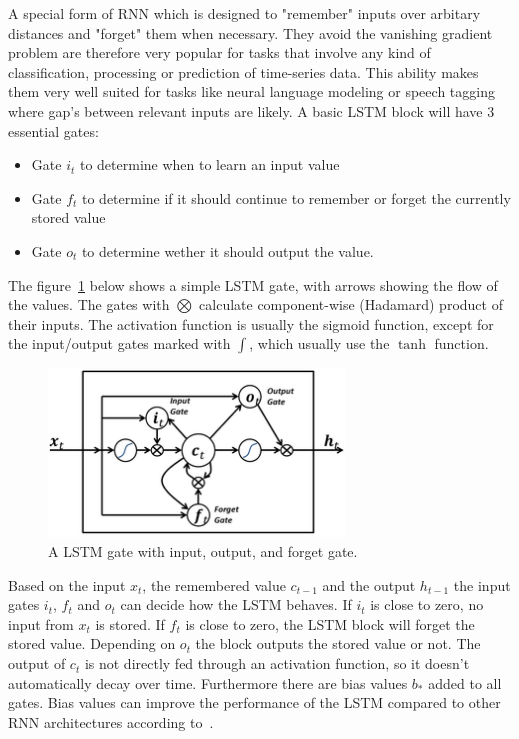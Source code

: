 A special form of RNN which is designed to "remember" inputs over arbitary distances and "forget" them when necessary.
They avoid the vanishing gradient problem are therefore very popular for tasks that involve any kind of classification,
processing or prediction of time-series data. This ability makes them very well suited for tasks like neural language modeling
or speech tagging where gap's between relevant inputs are likely.
A basic LSTM block will have 3 essential gates:

\begin{itemize}
\item Gate \(i_t\) to determine when to learn an input value
\item Gate \(f_t\) to determine if it should continue to remember or forget the currently stored value
\item Gate \(o_t\) to determine wether it should output the value.
\end{itemize}

The figure~\ref{fig:Long_Short_Term_Memory} below shows a simple LSTM gate, with arrows showing the flow of the values.
The gates with $\bigotimes$ calculate component-wise (Hadamard) product of their inputs. The activation function is usually 
the sigmoid function, except for the input/output gates marked with $\int$, which usually use the $\tanh$ function.

\begin{figure}[H]
\begin{center}
  \includegraphics[width=0.7\textwidth]{./img/Long_Short_Term_Memory}
  \caption{A LSTM gate with input, output, and forget gate.}
  \label{fig:Long_Short_Term_Memory}
\end{center}
\end{figure}
Based on the input $x_t$, the remembered value $c_{t-1}$ and the output $h_{t-1}$ the input gates $i_t$, $f_t$ and $o_t$ can
decide how the LSTM behaves. If $i_t$ is close to zero, no input from $x_t$ is stored. If $f_t$ is close to zero,
the LSTM block will forget the stored value. Depending on $o_t$ the block outputs the stored value or not.
The output of $c_t$ is not directly fed through an activation function, so it doesn't automatically decay
over time.
Furthermore there are bias values $b_*$ added to all gates. Bias values can improve the performance of the LSTM compared to other RNN 
architectures according to~\cite{icml2015_jozefowicz15}.

